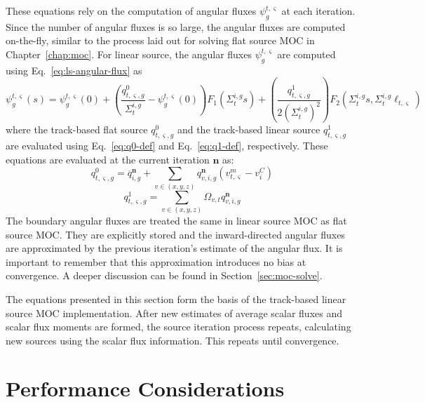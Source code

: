 These equations rely on the computation of angular fluxes $\psi_g^{t,\varsigma}$ at each iteration. Since the number of angular fluxes is so large, the angular fluxes are computed on-the-fly, similar to the process laid out for solving flat source \ac{MOC} in Chapter~\ref{chap:moc}. For linear source, the angular fluxes $\psi_g^{t,\varsigma}$ are computed using Eq.~\ref{eq:ls-angular-flux} as
\begin{equation*}
\psi_g^{t,\varsigma}(s) = \psi_g^{t,\varsigma}(0) + \left( \frac{q^0_{t,\varsigma,g}}{\Sigma_{t}^{i,g}} - \psi_g^{t,\varsigma}(0) \right) F_1\left(\Sigma_{t}^{i,g} s \right) + \left(\frac{q^1_{t,\varsigma,g}}{2\left(\Sigma_{t}^{i,g}\right)^2}\right) F_2\left(\Sigma_{t}^{i,g} s, \Sigma_{t}^{i,g} \ell_{t,\varsigma} \right)
\end{equation*}
where the track-based flat source $q^0_{t,\varsigma,g}$ and the track-based linear source $q^1_{t,\varsigma,g}$ are evaluated using Eq.~\ref{eq:q0-def} and Eq.~\ref{eq:q1-def}, respectively. These equations are evaluated at the current iteration $\mathbf{n}$ as:
\begin{equation}
q^0_{t,\varsigma,g} = \overline{q}_{i,g}^{\mathbf{n}} + \sum_{v \in (x,y,z)} q_{v,i,g}^{\mathbf{n}} \left( v^m_{t,\varsigma} - v^C_i \right)
\end{equation}
\begin{equation}
q^1_{t,\varsigma,g} = \sum_{v \in (x,y,z)} \Omega_{v,t} q_{v,i,g}^{\mathbf{n}}
\end{equation}
The boundary angular fluxes are treated the same in linear source \ac{MOC} as flat source \ac{MOC}. They are explicitly stored and the inward-directed angular fluxes are approximated by the previous iteration's estimate of the angular flux. It is important to remember that this approximation introduces no bias at convergence. A deeper discussion can be found in Section~\ref{sec:moc-solve}.

The equations presented in this section form the basis of the track-based linear source \ac{MOC} implementation. After new estimates of average scalar fluxes and scalar flux moments are formed, the source iteration process repeats, calculating new sources using the scalar flux information. This repeats until convergence.

\section{Performance Considerations}
\label{sec:ls-performance}

